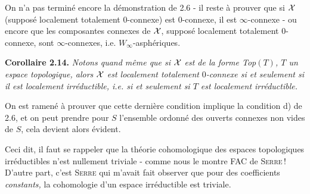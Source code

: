On n'a pas terminé encore la démonstration de 2.6 - il reste à prouver que si $\mathcal{X}$ (supposé localement totalement 0-connexe) est 0-connexe, il est $\infty$-connexe - ou encore que les composantes connexes de $\mathcal{X}$, supposé localement totalement 0-connexe, sont $\infty$-connexes, i.e. $W_\infty$-asphériques.

\textbf{Corollaire 2.14.} \textit{Notons quand même que si $\mathcal{X}$ est de la forme Top$(T)$, $T$ un espace topologique, alors $\mathcal{X}$ est localement totalement} $0$\textit{-connexe si et seulement si il est localement irréductible, i.e. si et seulement si $T$ est localement irréductible.}


On est ramené à prouver que cette dernière condition implique la condition d) de 2.6, et on peut prendre pour $S$ l'ensemble ordonné des ouverts connexes non vides de $S$, cela devient alors évident.

Ceci dit, il faut se rappeler que la théorie cohomologique des espaces topologiques irréductibles n'est nullement triviale - comme nous le montre FAC de \textsc{Serre}\,! D'autre part, c'est \textsc{Serre} qui m'avait fait observer que pour des coefficients \textit{constants,} la cohomologie d'un espace irréductible est triviale.


